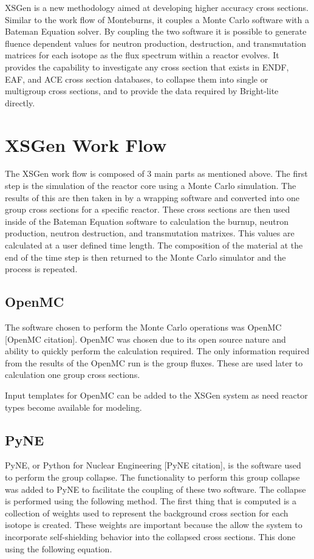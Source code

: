\documentclass{article}
\begin{document}
XSGen is a new methodology aimed at developing higher accuracy cross sections. Similar to the work flow of Monteburns, it couples a Monte Carlo software with a Bateman Equation solver.  By coupling the two software it is possible to generate fluence dependent values for neutron production, destruction, and transmutation matrices for each isotope as the flux spectrum within a reactor evolves. It provides the capability to investigate any cross section that exists in ENDF, EAF, and ACE cross section databases, to collapse them into single or multigroup cross sections, and to provide the data required by Bright-lite directly. 

\section{XSGen Work Flow}
The XSGen work flow is composed of 3 main parts as mentioned above. The first step is the simulation of the reactor core using a Monte Carlo simulation. The results of this are then taken in by a wrapping software and converted into one group cross sections for a specific reactor. These cross sections are then used inside of the Bateman Equation software to calculation the burnup, neutron production, neutron destruction, and transmutation matrixes. This values are calculated at a user defined time length. The composition of the material at the end of the time step is then returned to the Monte Carlo simulator and the process is repeated. 

\subsection{OpenMC}
The software chosen to perform the Monte Carlo operations was OpenMC [OpenMC citation].  OpenMC was chosen due to its open source nature and ability to quickly perform the calculation required. The only information required from the results of the OpenMC run is the group fluxes. These are used later to calculation one group cross sections. 

Input templates for OpenMC can be added to the XSGen system as need reactor types become available for modeling. 

\subsection{PyNE}
PyNE, or Python for Nuclear Engineering [PyNE citation], is the software used to perform the group collapse. The functionality to perform this group collapse was added to PyNE to facilitate the coupling of these two software. The collapse is performed using the following method. 
The first thing that is computed is a collection of weights used to represent the background cross section for each isotope is created. These weights are important because the allow the system to incorporate self-shielding behavior into the collapsed cross sections. This done using the following equation.
\end{document}
